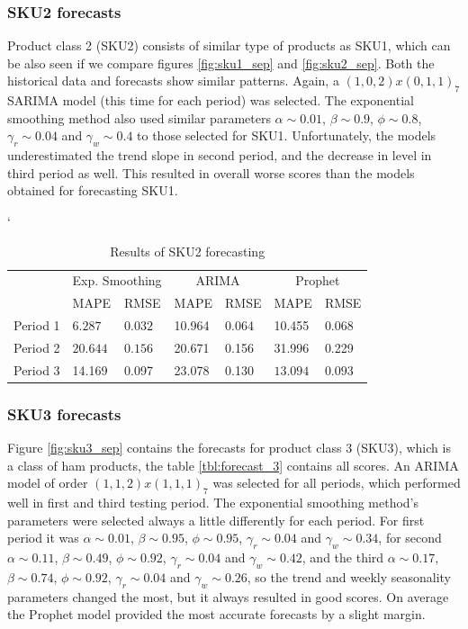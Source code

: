 \documentclass[11pt,a4paper]{article}
\begin{document}
\subsubsection{SKU2 forecasts}
Product class 2 (SKU2) consists of similar type of products as SKU1, which can be also seen if we compare figures \ref{fig:sku1_sep} and \ref{fig:sku2_sep}. Both the historical data and forecasts show similar patterns. Again, a $(1,0,2)x(0,1,1)_7$ SARIMA model  (this time for each period) was selected. The exponential smoothing method also used similar parameters $\alpha\sim 0.01$,  $\beta\sim 0.9$,  $\phi \sim 0.8$, $\gamma_r \sim 0.04$ and  $\gamma_w \sim 0.4$ to those selected for SKU1. Unfortunately, the models underestimated the trend slope in second period, and the decrease in level in third period as well. This resulted in overall worse scores than the models obtained for forecasting SKU1. 

\begin{table} \catcode`
\centering
\begin{tabular}{|l|l|l|l|l|l|l|}
\hline
\multirow{2}{*}{} & \multicolumn{2}{c|}{Exp. Smoothing} & \multicolumn{2}{c|}{ARIMA} & \multicolumn{2}{c|}{Prophet} \\ \cline{2-7} 
                  & MAPE         & RMSE        & MAPE          & RMSE          & MAPE         & RMSE         \\ \hline
Period 1 &  \boldmath$6.287$\unboldmath7 &	 \boldmath$0.032$\unboldmath&	10.964&	0.064&	10.455&	0.068	  \\ \hline	
Period 2 &  \boldmath$20.644$\unboldmath &	 \boldmath$0.156$\unboldmath&	20.671&	0.156&	31.996&	0.229  \\ \hline
Period 3 & 14.169 &	0.097&	23.078&	0.130&	 \boldmath$13.094$\unboldmath&	 \boldmath$0.093$\unboldmath	  \\ \hline
\end{tabular}
\caption{Results of SKU2 forecasting}
\label{tbl:forecast_2}
\end{table}




\newpage
\subsubsection{SKU3 forecasts}
Figure \ref{fig:sku3_sep} contains the forecasts for product class 3 (SKU3), which is a class of ham products, the table  \ref{tbl:forecast_3} contains all scores. An ARIMA model of order $(1,1,2)x(1,1,1)_7$ was selected for all periods, which performed well in first and third testing period.
The exponential smoothing method's parameters were selected always a little differently for each period. For first period it was  $\alpha\sim 0.01$,  $\beta\sim 0.95$,  $\phi \sim 0.95$, $\gamma_r \sim 0.04$ and  $\gamma_w \sim 0.34$, for second  $\alpha\sim 0.11$,  $\beta\sim 0.49$, $\phi \sim 0.92$, $\gamma_r \sim 0.04$ and  $\gamma_w \sim 0.42$, and the third  $\alpha\sim 0.17$,  $\beta\sim 0.74$,  $\phi \sim 0.92$, $\gamma_r \sim 0.04$ and  $\gamma_w \sim 0.26$, so the trend and weekly seasonality parameters changed the most, but it always resulted in good scores. On average the Prophet model provided the most accurate forecasts by a slight margin.
\end{document}
